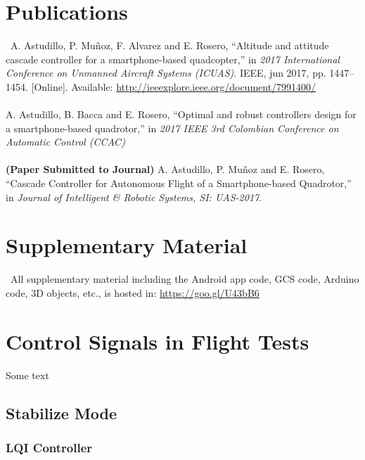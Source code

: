 \begin{appendices}
\chapter{Publications} \label{publications}
\
A. Astudillo, P. Muñoz, F. Alvarez and E. Rosero, “Altitude and attitude cascade controller for a smartphone-based quadcopter,” in \textit{2017 International Conference on Unmanned Aircraft Systems (ICUAS)}. IEEE, jun 2017, pp. 1447–1454. [Online]. Available: \url{http://ieeexplore.ieee.org/document/7991400/}
\\\\
A. Astudillo, B. Bacca and E. Rosero, “Optimal and robust controllers design for a smartphone-based quadrotor,” in \textit{2017 IEEE 3rd Colombian Conference on Automatic Control (CCAC)}
\\\\
\textbf{(Paper Submitted to Journal)} A. Astudillo, P. Muñoz and E. Rosero, “Cascade Controller for Autonomous Flight of a Smartphone-based Quadrotor,” in \textit{Journal of Intelligent \& Robotic Systems, SI: UAS-2017}.

\chapter{Supplementary Material} \label{supplementary}
\
All supplementary material including the Android app code, GCS code, Arduino code, 3D objects, etc., is hosted in:
\url{https://goo.gl/U43bB6}


\chapter{Control Signals in Flight Tests}
Some text
\section*{Stabilize Mode}

\subsection*{LQI Controller}


\end{appendices}
